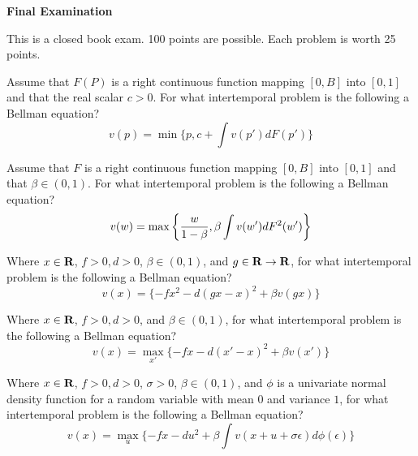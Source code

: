 
\paper

\overfullrule=0pt
\def\frac#1#2{#1\over #2}
%
\def\bmatrix#1{\left[ \matrix{#1} \right]}
\def\be{{\beta}}
\def\toone{{t+1}}

\overfullrule=0pt

%

\centerline{\bf Final Examination}


\medskip

  This is a closed book  exam.  100 points are possible. Each problem is worth 25 points.


\medskip



Assume that  $F(P)$ is a right continuous function mapping $[0, B]$ into $[0,1]$ and that the real scalar $c > 0$.  For what intertemporal problem is the following
a Bellman equation?
$$ v(p) = \min \{p, c + \int v(p') d F(p') \}$$

\medskip



  Assume that  $F$ is a right continuous function mapping $[0, B]$ into $[0,1]$ and that $\beta \in (0,1)$. For what intertemporal problem is the following a Bellman equation?
$$ v(w) = \max\left\{ {w\over{1-\beta}},  \beta \int v(w') d F^2(w') \right\} $$



\medskip
{} Where $x \in {\bf R}$, $f >0, d >0 $,   $\beta \in (0,1)$, and $g \in  {\bf R} \rightarrow {\bf R}$, for what intertemporal problem is the following  a Bellman equation?
$$ v(x) =  \{- f x^2 - d(gx  - x)^2 + \beta v(gx) \} $$



\medskip
{}   Where $x \in {\bf R}$, $f >0, d >0 $, and   $\beta \in (0,1)$, for what intertemporal problem is the following  a Bellman equation?
$$ v(x) = \max_{x'} \{ - f x - d(x' - x)^2 + \beta v(x') \} $$

\medskip
{} Where $x \in {\bf R}$, $f >0, d >0 $, $\sigma >0$,    $\beta \in (0,1)$, and $\phi$ is a univariate normal density function for a random
variable with mean $0$ and variance $1$, for what intertemporal problem is the following  a Bellman equation?
$$ v(x) = \max_{u} \{ - f x - d u^2 + \beta \int v(x +u + \sigma \epsilon) d \phi(\epsilon) \} $$



